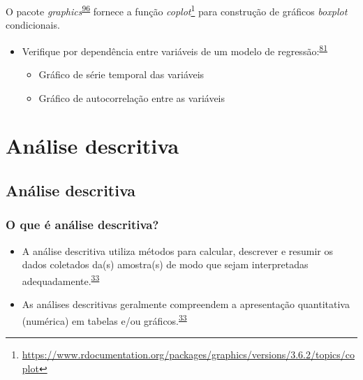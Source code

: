 \documentclass[
  a4paper,
]{book}
\renewcommand{\href}[2]{#2\footnote{\url{#1}}}
\newenvironment{infobox}[1]
  {
  \begin{itemize}
  \renewcommand{\labelitemi}{
    \raisebox{-.7\height}[0pt][0pt]{
      {\setkeys{Gin}{width=3em,keepaspectratio}
        \texttt{[image: \#1]}}
    }
  }
  \setlength{\fboxsep}{1em}
  \begin{blackbox}
  \item
  }
  {
  \end{blackbox}
  \end{itemize}
  }
\begin{document}
\begin{infobox}{images/Rlogo}
O pacote \emph{graphics}\textsuperscript{\protect\hyperlink{ref-graphics}{96}} fornece a função \href{https://www.rdocumentation.org/packages/graphics/versions/3.6.2/topics/coplot}{\emph{coplot}} para construção de gráficos \emph{boxplot} condicionais.

\end{infobox}

\begin{itemize}
\item
  Verifique por dependência entre variáveis de um modelo de regressão:\textsuperscript{\protect\hyperlink{ref-zuur2009}{81}}

  \begin{itemize}
  \item
    Gráfico de série temporal das variáveis
  \item
    Gráfico de autocorrelação entre as variáveis
  \end{itemize}
\end{itemize}

\hypertarget{analise-descritiva}{%
\chapter{\texorpdfstring{\textbf{Análise descritiva}}{Análise descritiva}}\label{analise-descritiva}}

\hypertarget{descritiva}{%
\section{Análise descritiva}\label{descritiva}}

\hypertarget{o-que-uxe9-anuxe1lise-descritiva}{%
\subsection{O que é análise descritiva?}\label{o-que-uxe9-anuxe1lise-descritiva}}

\begin{itemize}
\item
  A análise descritiva utiliza métodos para calcular, descrever e resumir os dados coletados da(s) amostra(s) de modo que sejam interpretadas adequadamente.\textsuperscript{\protect\hyperlink{ref-vetter2017}{33}}
\item
  As análises descritivas geralmente compreendem a apresentação quantitativa (numérica) em tabelas e/ou gráficos.\textsuperscript{\protect\hyperlink{ref-vetter2017}{33}}
\end{itemize}
\end{document}
